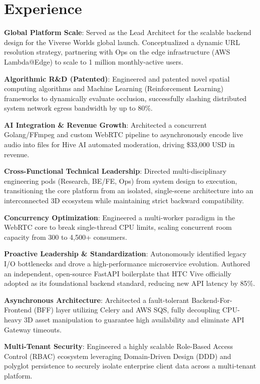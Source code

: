 \section{Experience}

\begin{resumeitems}
\item \textbf{Global Platform Scale}: Served as the Lead Architect for the scalable backend design for the Viverse Worlds global launch. Conceptualized a dynamic URL resolution strategy, partnering with Ops on the edge infrastructure (AWS Lambda@Edge) to scale to 1 million monthly-active users.
\item \textbf{Algorithmic R\&D (Patented)}: Engineered and patented novel spatial computing algorithms and Machine Learning (Reinforcement Learning) frameworks to dynamically evaluate occlusion, successfully slashing distributed system network egress bandwidth by up to 80\%.
\item \textbf{AI Integration \& Revenue Growth}: Architected a concurrent Golang/FFmpeg and custom WebRTC pipeline to asynchronously encode live audio into files for Hive AI automated moderation, driving \$33,000 USD in revenue.
\item \textbf{Cross-Functional Technical Leadership}: Directed multi-disciplinary engineering pods (Research, BE/FE, Ops) from system design to execution, transitioning the core platform from an isolated, single-scene architecture into an interconnected 3D ecosystem while maintaining strict backward compatibility.
\item \textbf{Concurrency Optimization}: Engineered a multi-worker paradigm in the WebRTC core to break single-thread CPU limits, scaling concurrent room capacity from 300 to 4,500+ consumers.
\end{resumeitems}

\begin{resumeitems}
\item \textbf{Proactive Leadership \& Standardization}: Autonomously identified legacy I/O bottlenecks and drove a high-performance microservice evolution. Authored an independent, open-source FastAPI boilerplate that HTC Vive officially adopted as its foundational backend standard, reducing new API latency by 85\%.
\item \textbf{Asynchronous Architecture}: Architected a fault-tolerant Backend-For-Frontend (BFF) layer utilizing Celery and AWS SQS, fully decoupling CPU-heavy 3D asset manipulation to guarantee high availability and eliminate API Gateway timeouts.
\item \textbf{Multi-Tenant Security}: Engineered a highly scalable Role-Based Access Control (RBAC) ecosystem leveraging Domain-Driven Design (DDD) and polyglot persistence to securely isolate enterprise client data across a multi-tenant platform.
\end{resumeitems}

